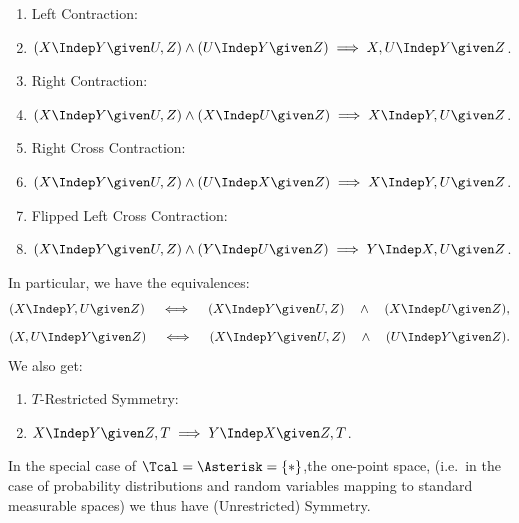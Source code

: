\begin{DefThm}
\begin{enumerate}[label=\alph*)]
\item Left Contraction:\item[] 
 $ (X \Indep  Y \given U , Z) \land (U \Indep  Y \given Z) \implies X , U \Indep  Y \given Z$.
\item Right Contraction:
\item[] $ (X \Indep  Y \given U , Z) \land (X \Indep  U \given Z)  \implies X \Indep  Y , U \given Z$.
\item Right Cross Contraction:
\item[] $ (X \Indep  Y \given U , Z) \land (U \Indep  X \given Z) \implies X  \Indep  Y , U \given Z$.
\item Flipped Left Cross Contraction: 
\item[] $ (X \Indep  Y \given U , Z) \land (Y \Indep  U \given Z) \implies Y \Indep  X , U \given Z$.
\end{enumerate}
In particular, we have the equivalences:
$$ (X \Indep  Y , U \given Z) \quad\iff\quad (X \Indep  Y \given U , Z) \quad\land\quad (X \Indep  U \given Z)  ,$$
$$ (X , U \Indep  Y \given Z) \quad\iff\quad (X \Indep  Y \given U , Z) \quad\land\quad (U \Indep  Y \given Z).$$
We also get:
\begin{enumerate}[resume,label=\alph*)]
    \item $T$-Restricted Symmetry: %
	\item[] $X \Indep  Y \given Z,T \implies Y \Indep X \given Z,T$. 
\end{enumerate}
In the special case of $\Tcal = \Asterisk = \{\ast\}$,the one-point space, (i.e.\ in the case of probability distributions and random variables mapping to standard measurable spaces) we
thus have (Unrestricted) Symmetry.
\end{DefThm}



